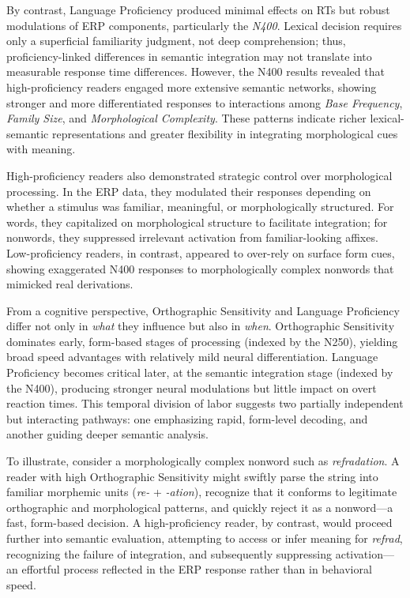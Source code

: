 \documentclass[preprint,12pt, authoryear, review]{elsarticle}
\begin{document}
By contrast, Language Proficiency produced minimal effects on RTs but robust modulations of ERP components, particularly the \textit{N400}. Lexical decision requires only a superficial familiarity judgment, not deep comprehension; thus, proficiency-linked differences in semantic integration may not translate into measurable response time differences. However, the N400 results revealed that high-proficiency readers engaged more extensive semantic networks, showing stronger and more differentiated responses to interactions among \textit{Base Frequency}, \textit{Family Size}, and \textit{Morphological Complexity}. These patterns indicate richer lexical-semantic representations and greater flexibility in integrating morphological cues with meaning.

High-proficiency readers also demonstrated strategic control over morphological processing. In the ERP data, they modulated their responses depending on whether a stimulus was familiar, meaningful, or morphologically structured. For words, they capitalized on morphological structure to facilitate integration; for nonwords, they suppressed irrelevant activation from familiar-looking affixes. Low-proficiency readers, in contrast, appeared to over-rely on surface form cues, showing exaggerated N400 responses to morphologically complex nonwords that mimicked real derivations.

From a cognitive perspective, Orthographic Sensitivity and Language Proficiency differ not only in \textit{what} they influence but also in \textit{when}. Orthographic Sensitivity dominates early, form-based stages of processing (indexed by the N250), yielding broad speed advantages with relatively mild neural differentiation. Language Proficiency becomes critical later, at the semantic integration stage (indexed by the N400), producing stronger neural modulations but little impact on overt reaction times. This temporal division of labor suggests two partially independent but interacting pathways: one emphasizing rapid, form-level decoding, and another guiding deeper semantic analysis.

To illustrate, consider a morphologically complex nonword such as \textit{refradation}. A reader with high Orthographic Sensitivity might swiftly parse the string into familiar morphemic units (\textit{re-} + \textit{-ation}), recognize that it conforms to legitimate orthographic and morphological patterns, and quickly reject it as a nonword—a fast, form-based decision. A high-proficiency reader, by contrast, would proceed further into semantic evaluation, attempting to access or infer meaning for \textit{refrad}, recognizing the failure of integration, and subsequently suppressing activation—an effortful process reflected in the ERP response rather than in behavioral speed.
\end{document}
